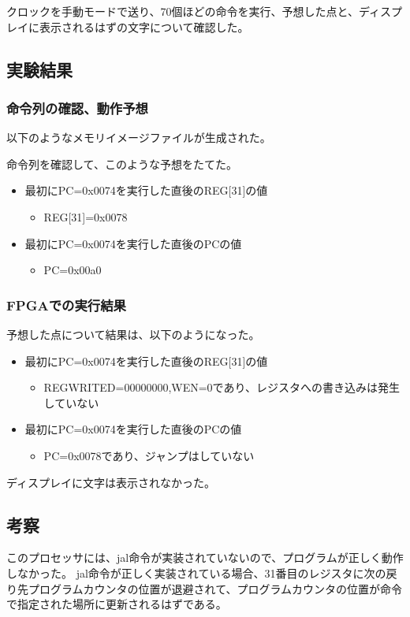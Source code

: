 クロックを手動モードで送り、70個ほどの命令を実行、予想した点と、ディスプレイに表示されるはずの文字について確認した。

\subsection{実験結果}
\subsubsection{命令列の確認、動作予想}
以下のようなメモリイメージファイルが生成された。


命令列を確認して、このような予想をたてた。
\begin{itemize}
  \item 最初にPC=0x0074を実行した直後のREG[31]の値
  \begin{itemize}
    \item REG[31]=0x0078
  \end{itemize}
  \item 最初にPC=0x0074を実行した直後のPCの値
  \begin{itemize}
    \item PC=0x00a0
  \end{itemize}
\end{itemize}

\subsubsection{FPGAでの実行結果}
予想した点について結果は、以下のようになった。
\begin{itemize}
  \item 最初にPC=0x0074を実行した直後のREG[31]の値
  \begin{itemize}
    \item REGWRITED=00000000,WEN=0であり、レジスタへの書き込みは発生していない
  \end{itemize}
  \item 最初にPC=0x0074を実行した直後のPCの値
  \begin{itemize}
    \item PC=0x0078であり、ジャンプはしていない
  \end{itemize}
\end{itemize}

ディスプレイに文字は表示されなかった。

\subsection{考察}
このプロセッサには、jal命令が実装されていないので、プログラムが正しく動作しなかった。
jal命令が正しく実装されている場合、31番目のレジスタに次の戻り先プログラムカウンタの位置が退避されて、プログラムカウンタの位置が命令で指定された場所に更新されるはずである。
